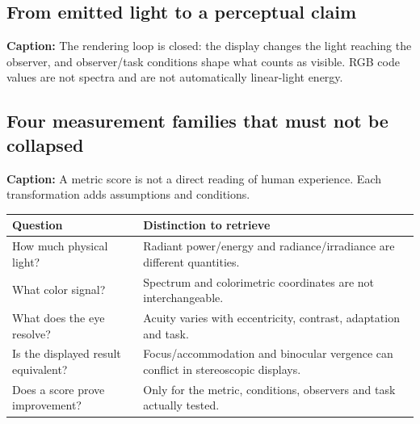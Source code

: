 \subsection{From emitted light to a perceptual claim}\label{appendix-73c6b8ed5a87-from-emitted-light-to-a-perceptual-claim}

\hypertarget{appendix-73c6b8ed5a87-from-emitted-light-to-a-perceptual-claim}{}


\textbf{Caption:} The rendering loop is closed: the display changes the light reaching the observer, and observer/task conditions shape what counts as visible. RGB code values are not spectra and are not automatically linear-light energy.

\subsection{Four measurement families that must not be collapsed}\label{appendix-73c6b8ed5a87-four-measurement-families-that-must-not-be-collapsed}

\hypertarget{appendix-73c6b8ed5a87-four-measurement-families-that-must-not-be-collapsed}{}


\textbf{Caption:} A metric score is not a direct reading of human experience. Each transformation adds assumptions and conditions.

{\def\LTcaptype{none} %
\begin{longtable}[]{@{}
  >{\raggedright\arraybackslash}p{}
  >{\raggedright\arraybackslash}p{}@{}}
\toprule\noalign{}
\begin{minipage}[b]{\linewidth}\raggedright
Question
\end{minipage} & \begin{minipage}[b]{\linewidth}\raggedright
Distinction to retrieve
\end{minipage} \\
\midrule\noalign{}
\endhead
\bottomrule\noalign{}
\endlastfoot
How much physical light? & Radiant power/energy and radiance/irradiance are different quantities. \\
What color signal? & Spectrum and colorimetric coordinates are not interchangeable. \\
What does the eye resolve? & Acuity varies with eccentricity, contrast, adaptation and task. \\
Is the displayed result equivalent? & Focus/accommodation and binocular vergence can conflict in stereoscopic displays. \\
Does a score prove improvement? & Only for the metric, conditions, observers and task actually tested. \\
\end{longtable}
}

